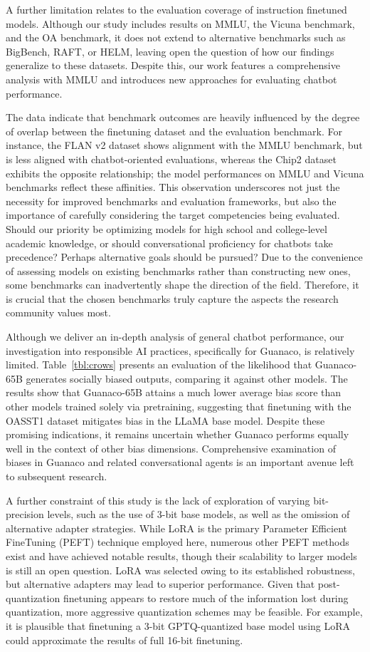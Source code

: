 A further limitation relates to the evaluation coverage of instruction finetuned models. Although our study includes results on MMLU, the Vicuna benchmark, and the OA benchmark, it does not extend to alternative benchmarks such as BigBench, RAFT, or HELM, leaving open the question of how our findings generalize to these datasets. Despite this, our work features a comprehensive analysis with MMLU and introduces new approaches for evaluating chatbot performance.

The data indicate that benchmark outcomes are heavily influenced by the degree of overlap between the finetuning dataset and the evaluation benchmark. For instance, the FLAN v2 dataset shows alignment with the MMLU benchmark, but is less aligned with chatbot-oriented evaluations, whereas the Chip2 dataset exhibits the opposite relationship; the model performances on MMLU and Vicuna benchmarks reflect these affinities. This observation underscores not just the necessity for improved benchmarks and evaluation frameworks, but also the importance of carefully considering the target competencies being evaluated. Should our priority be optimizing models for high school and college-level academic knowledge, or should conversational proficiency for chatbots take precedence? Perhaps alternative goals should be pursued? Due to the convenience of assessing models on existing benchmarks rather than constructing new ones, some benchmarks can inadvertently shape the direction of the field. Therefore, it is crucial that the chosen benchmarks truly capture the aspects the research community values most.

Although we deliver an in-depth analysis of general chatbot performance, our investigation into responsible AI practices, specifically for {Guanaco}, is relatively limited. Table~\ref{tbl:crows} presents an evaluation of the likelihood that {Guanaco}-65B generates socially biased outputs, comparing it against other models. The results show that {Guanaco}-65B attains a much lower average bias score than other models trained solely via pretraining, suggesting that finetuning with the OASST1 dataset mitigates bias in the LLaMA base model. Despite these promising indications, it remains uncertain whether {Guanaco} performs equally well in the context of other bias dimensions. Comprehensive examination of biases in {Guanaco} and related conversational agents is an important avenue left to subsequent research.

A further constraint of this study is the lack of exploration of varying bit-precision levels, such as the use of 3-bit base models, as well as the omission of alternative adapter strategies. While LoRA is the primary Parameter Efficient FineTuning (PEFT) technique employed here, numerous other PEFT methods exist and have achieved notable results, though their scalability to larger models is still an open question. LoRA was selected owing to its established robustness, but alternative adapters may lead to superior performance. Given that post-quantization finetuning appears to restore much of the information lost during quantization, more aggressive quantization schemes may be feasible. For example, it is plausible that finetuning a 3-bit GPTQ-quantized base model using LoRA could approximate the results of full 16-bit finetuning.

